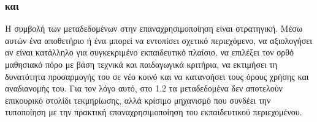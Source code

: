 \subsubsection{ και }

Η συμβολή των μεταδεδομένων στην επαναχρησιμοποίηση είναι στρατηγική. Μέσω αυτών ένα αποθετήριο ή ένα  μπορεί να εντοπίσει σχετικό περιεχόμενο, να αξιολογήσει αν είναι κατάλληλο για συγκεκριμένο εκπαιδευτικό πλαίσιο, να επιλέξει τον ορθό μαθησιακό πόρο με βάση τεχνικά και παιδαγωγικά κριτήρια, να εκτιμήσει τη δυνατότητα προσαρμογής του σε νέο κοινό και να κατανοήσει τους όρους χρήσης και αναδιανομής του. Για τον λόγο αυτό, στο  1.2 τα μεταδεδομένα δεν αποτελούν επικουρικό στολίδι τεκμηρίωσης, αλλά κρίσιμο μηχανισμό που συνδέει την τυποποίηση με την πρακτική επαναχρησιμοποίηση του εκπαιδευτικού περιεχομένου.
